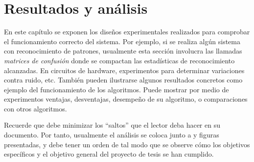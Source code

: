 \chapter{Resultados y análisis}

En este capítulo se exponen los diseños experimentales realizados para
comprobar el funcionamiento correcto del sistema. Por ejemplo, si se
realiza algún sistema con reconocimiento de patrones, usualmente esta
sección involucra las llamadas \emph{matrices de confusión} donde se
compactan las estadísticas de reconocimiento alcanzadas. En circuitos
de hardware, experimentos para determinar variaciones contra ruido,
etc. También pueden ilustrarse algunos resultados concretos como
ejemplo del funcionamiento de los algoritmos. Puede mostrar por medio
de experimentos ventajas, desventajas, desempeño de su algoritmo, o
comparaciones con otros algoritmos.

Recuerde que debe minimizar los ``saltos'' que el lector deba hacer en
su documento. Por tanto, usualmente el análisis se coloca junto a
\tablas y figuras presentadas, y debe tener un orden de tal modo que se
observe cómo los objetivos específicos y el objetivo general del
proyecto de tesis se han cumplido.
